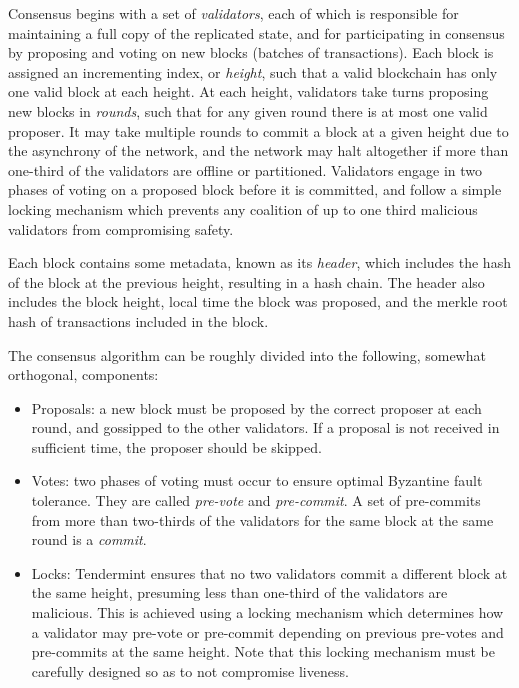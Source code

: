 Consensus begins with a set of \emph{validators}, each of which is responsible for maintaining a full copy of the replicated state,
and for participating in consensus by proposing and voting on new blocks (batches of transactions).
Each block is assigned an incrementing index, or \emph{height}, such that a valid blockchain has only one valid block at each height.
At each height, validators take turns proposing new blocks in \emph{rounds}, such that for any given round there is at most one valid proposer.
It may take multiple rounds to commit a block at a given height due to the asynchrony of the network,
and the network may halt altogether if more than one-third of the validators are offline or partitioned.
Validators engage in two phases of voting on a proposed block before it is committed, 
and follow a simple locking mechanism which prevents any coalition of up to one third malicious validators from compromising safety.

Each block contains some metadata, known as its \emph{header}, which includes the hash of the block at the previous height, resulting in a hash chain.
The header also includes the block height, local time the block was proposed, and the merkle root hash of transactions included in the block.

The consensus algorithm can be roughly divided into the following, somewhat orthogonal, components:

\begin{itemize}

\item{Proposals: a new block must be proposed by the correct proposer at each round, and gossipped to the other validators. If a proposal is not received in sufficient time, the proposer should be skipped.}

\item{Votes: two phases of voting must occur to ensure optimal Byzantine fault tolerance. They are called \emph{pre-vote} and \emph{pre-commit}. A set of pre-commits from more than two-thirds of the validators for the same block at the same round is a \emph{commit}.}

\item{Locks: Tendermint ensures that no two validators commit a different block at the same height, presuming less than one-third of the validators are malicious. This is achieved using a locking mechanism which determines how a validator may pre-vote or pre-commit depending on previous pre-votes and pre-commits at the same height. Note that this locking mechanism must be carefully designed so as to not compromise liveness.}

\end{itemize}

